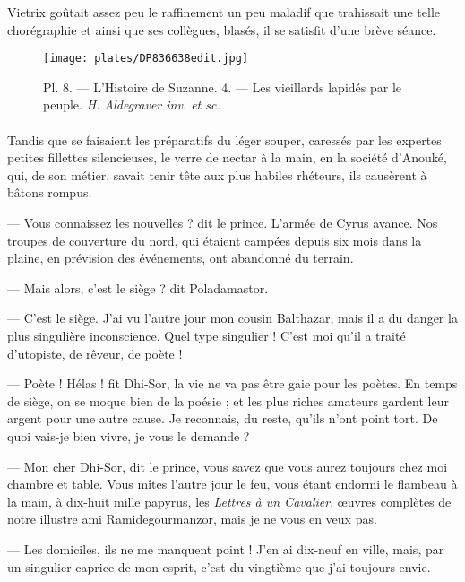 \documentclass[a4paper, 11pt, oneside, polutonikogreek, french]{article}
\begin{document}
Vietrix goûtait assez peu le raffinement un peu maladif que trahissait une telle chorégraphie et ainsi que ses collègues, blasés, il se satisfit d'une brève séance.

\bigskip
\centerline{\EightStarTaper}
\centerline{\EightStarTaper\EightStarTaper}
\bigskip
\clearpage
\vspace*{\fill}
\begin{figure}[H]
\centering
\texttt{[image: plates/DP836638edit.jpg]}
\caption{\Fontauri Pl. 8. --- L'Histoire de Suzanne. 4. --- Les vieillards lapidés par le peuple. \emph{H. Aldegraver inv. et sc.}}
\end{figure}
\vspace*{\fill}
\clearpage
\paragraph{}
Tandis que se faisaient les préparatifs du léger souper, caressés par les expertes petites fillettes silencieuses, le verre de nectar à la main, en la société d'Anouké, qui, de son métier, savait tenir tête aux plus habiles rhéteurs, ils causèrent à bâtons rompus.

--- Vous connaissez les nouvelles ? dit le prince. L'armée de Cyrus avance. Nos troupes de couverture du nord, qui étaient campées depuis six mois dans la plaine, en prévision des événements, ont abandonné du terrain.

--- Mais alors, c'est le siège ? dit Poladamastor.

--- C'est le siège. J'ai vu l'autre jour mon cousin Balthazar, mais il a du danger la plus singulière inconscience. Quel type singulier ! C'est moi qu'il a traité d'utopiste, de rêveur, de poète !

--- Poète ! Hélas ! fit Dhi-Sor, la vie ne va pas être gaie pour les poètes. En temps de siège, on se moque bien de la poésie ; et les plus riches amateurs gardent leur argent pour une autre cause. Je reconnais, du reste, qu'ils n'ont point tort. De quoi vais-je bien vivre, je vous le demande ?

--- Mon cher Dhi-Sor, dit le prince, vous savez que vous aurez toujours chez moi chambre et table. Vous mîtes l'autre jour le feu, vous étant endormi le flambeau à la main, à dix-huit mille papyrus, les \emph{Lettres à un Cavalier}, œuvres complètes de notre illustre ami Ramidegourmanzor, mais je ne vous en veux pas.

--- Les domiciles, ils ne me manquent point ! J'en ai dix-neuf en ville, mais, par un singulier caprice de mon esprit, c'est du vingtième que j'ai toujours envie.
\end{document}
